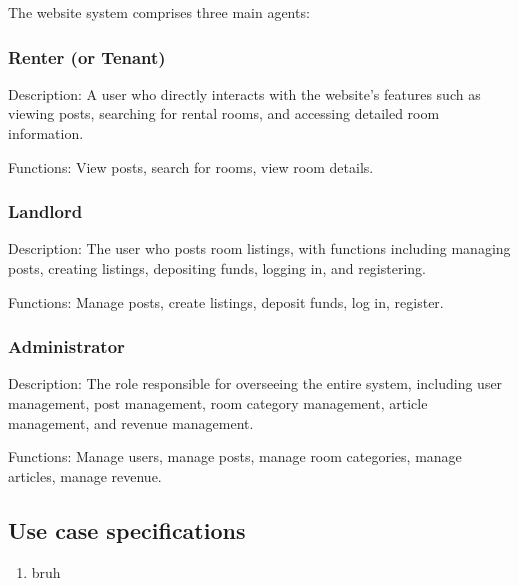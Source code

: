 \documentclass[../Main.tex]{subfiles}
\begin{document}
The website system comprises three main agents:
\subsubsection{Renter (or Tenant)}

Description: A user who directly interacts with the website's features such as viewing posts, searching for rental rooms, and accessing detailed room information.

Functions: View posts, search for rooms, view room details.

\subsubsection{Landlord}
Description: The user who posts room listings, with functions including managing posts, creating listings, depositing funds, logging in, and registering.

Functions: Manage posts, create listings, deposit funds, log in, register.

\subsubsection{Administrator}

Description: The role responsible for overseeing the entire system, including user management, post management, room category management, article management, and revenue management.

Functions: Manage users, manage posts, manage room categories, manage articles, manage revenue.

\subsection{Use case specifications}

\begin{enumerate}
    \item bruh
\end{enumerate}
\end{document}
